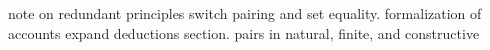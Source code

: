 
note on redundant principles
switch pairing and set equality.
formalization of accounts
expand deductions section.
pairs in natural, finite, and constructive

\blankpage
